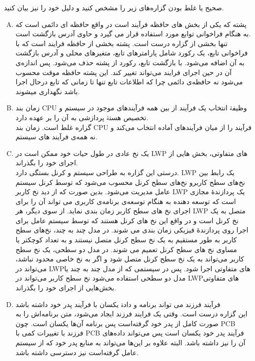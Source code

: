 \documentclass[]{article}
\begin{document}
صحیح یا غلط بودن  گزاره‌های زیر را مشخص کنید و دلیل خود را نیز بیان کنید.
\vspace{0.2cm}
\begin{enumerate}[(A)]
    \item {ﭘﺸﺘﻪ ﮐﻪ ﯾﮑﯽ ﺍﺯ ﺑﺨﺶ ﻫﺎﯼ ﺣﺎﻓﻈﻪ ﻓﺮﺁﯾﻨﺪ ﺍﺳﺖ ﺩﺭ ﻭﺍﻗﻊ ﺣﺎﻓﻈﻪ ﺍﯼ ﺩﺍﺋﻤﯽ ﺍﺳﺖ
          ﮐﻪ ﺑﻪ ﻫﻨﮕﺎﻡ ﻓﺮﺍﺧﻮﺍﻧﯽ ﺗﻮﺍﺑﻊ ﻣﻮﺭﺩ ﺍﺳﺘﻔﺎﺩﻩ ﻗﺮﺍﺭ ﻣﯽ ﮔﯿﺮﺩ ﻭ ﺣﺎﻭﯼ ﺁﺩﺭﺱ ﺑﺎﺯﮔﺸﺖ ﺍﺳﺖ.}
          \\
          تنها بخشی از گزاره درست است. پشته بخشی از حافظه فرایند است که با فراخوانی تابع،
          یک رکورد شامل  پارامترهای تابع، متغیرهای محلی و آدرس بازگشت به آن اضافه می‌شود.
          با بازگشت تابع، رکورد از پشته حذف می‌شود. پس اندازه‌ی آن در حین اجرای فرایند می‌تواند تغییر کند.
          این پشته حافظه موقت محسوب می‌شود نه حافظه‌ی دائمی چرا که اطلاعات تابع تنها
          تا زمانی که تابع درحال اجرا باشد نگهداری میشوند.

    \item {ﺯﻣﺎﻥ ﺑﻨﺪ CPU ﻭﻇﯿﻔﮥ ﺍﻧﺘﺨﺎﺏ ﯾﮏ ﻓﺮﺁﯾﻨﺪ ﺍﺯ ﺑﯿﻦ ﻫﻤﻪ ﻓﺮﺁﯾﻨﺪﻫﺎﯼ ﻣﻮﺟﻮﺩ ﺩﺭ ﺳﯿﺴﺘﻢ ﻭ
          ﺗﺨﺼﯿﺺ ﻫﺴﺘﮥ ﭘﺮﺩﺍﺯﺷﯽ ﺑﻪ ﺁﻥ ﺭﺍ ﺑﺮ ﻋﻬﺪﻩ ﺩﺍﺭﺩ.}
          \\ گزاره غلط است.
          زمان بند CPU
          فرآیند را از میان فرآیند‌های آماده انتخاب می‌کند و نه همه‌ی فرآیند های سیستم.

    \item  ﯾﮏ ﻧﺦ ﻋﺎﺩﯼ ﺩﺭ ﻃﻮﻝ ﺣﯿﺎﺕ ﺧﻮﺩ ﻣﻤﮑﻦ ﺍﺳﺖ ﺩﺭ LWP ﻫﺎﯼ ﻣﺘﻔﺎﻭﺗﯽ، ﺑﺨﺶ ﻫﺎﯾﯽ ﺍﺯ ﺍﺟﺮﺍﯼ ﺧﻮﺩ ﺭﺍ ﺑﮕﺬﺭﺍﻧﺪ.
    \\
    درستی این گزاره به طراحی سیستم و کرنل بستگی دارد.
    LWP یک رابط بین نخ‌های سطح کاربرو نخ‌های سطح کرنل محسوب می‌شود که توسط کرنل سیستم‌ عامل مدیریت می‌شود.
    بدین صورت که از دید نخ کاربر LWP یک پردازندۀ مجازی است که توسعه دهنده به هنگام توسعه‌ی برنامه‌ی کاربری می تواند آن را برای اجرای نخ های سطح کاربر زمان بندی نماید. 
    از سوی دیگر، هر LWP متصل به یک نخ کرنل است و در واقع این نخ های کرنل هستند که توسط سیستم عامل برای اجرا روی پردازندۀ فیزیکی زمان بندی می شوند.
    در مدل چند به چند، نخ‌های سطح کاربر به طور مستقیم به یک نخ‌ سطح کرنل متصل نیستند و به تعداد کوچکتر یا مساوی نخ های سطح کرنل تعمیم می شوند.
    در مدل دو سطحی، یک نخ سطح کاربر می‌تواند به یک نخ سطح کرنل متصل شود و اگر به نخ خاصی محدود نباشد، می‌تواند در LWPهای متفاوتی اجرا شود.
    پس در سیستمی که از مدل چند به چند یا مدل دو سطحی استفاده می‌شود نخ سطح کاربر می‌تواند در LWPهای متفاوتی بخش‌هایی از اجرای خود را بگذراند.

    \item ﻓﺮﺁﯾﻨﺪ ﻓﺮﺯﻧﺪ ﻣﯽ ﺗﻮﺍﻧﺪ ﺑﺮﻧﺎﻣﻪ ﻭ ﺩﺍﺩﮤ ﯾﮑﺴﺎﻥ ﺑﺎ ﻓﺮﺁﯾﻨﺪ ﭘﺪﺭ ﺧﻮﺩ ﺩﺍﺷﺘﻪ ﺑﺎﺷﺪ
          \\
          این گزاره درست است. وقتی یک فرایند فرزند ایجاد می‌شود،
          متن برنامه‌اش را به صورت کامل از پدر خود گرفته‌است پس برنامه آن‌ها یکسان است.
          چون PCB فرزند
          با تغییرات کمی با PCB
          فرآیند پدر خود یکسان است پس می‌تواند داده‌های آن را نیز داشته باشد.
          البته علاوه بر این‌ها می‌تواند به منابع پدر خود که از سیستم عامل گرفته‌است
          نیز دسترسی داشته باشد.


\end{enumerate}
\end{document}
